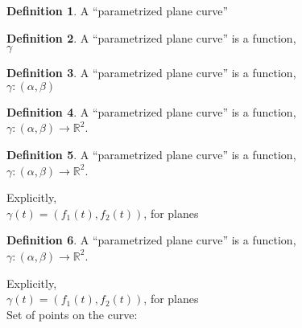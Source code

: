\documentclass[twocolumn,20pt,fleqn]{extarticle}
\theoremstyle{plain}
\theoremstyle{definition}
\newtheorem*{definition}{Definition}
\theoremstyle{remark}
\begin{document}
\clearpage




\begin{definition}
  A  ``parametrized plane curve'' \end{definition}


\clearpage




\begin{definition}
  A  ``parametrized plane curve''  is a  function,\\ $\gamma $\end{definition}


\clearpage




\begin{definition}
  A  ``parametrized plane curve''  is a  function,\\ $\gamma  : (\alpha, \beta) $\end{definition}


\clearpage




\begin{definition}
  A  ``parametrized plane curve''  is a  function,\\ $\gamma  : (\alpha, \beta) \to \mathbb{R}^2$.
\end{definition}




\clearpage




\begin{definition}
  A  ``parametrized plane curve''  is a  function,\\ $\gamma  : (\alpha, \beta) \to \mathbb{R}^2$.
\end{definition}

Explicitly,\\
$\gamma(t) = (f_1(t), f_2(t))$, for planes


\clearpage




\begin{definition}
  A  ``parametrized plane curve''  is a  function,\\ $\gamma  : (\alpha, \beta) \to \mathbb{R}^2$.
\end{definition}

Explicitly,\\
$\gamma(t) = (f_1(t), f_2(t))$, for planes\\

Set of points on the curve:\\ 
\end{document}
